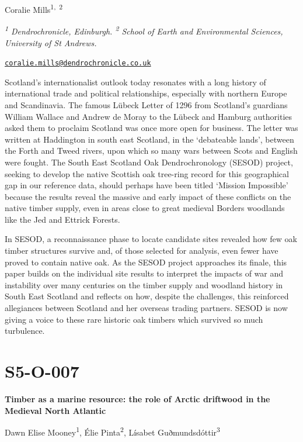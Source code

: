 \documentclass[
]{book}
\begin{document}
Coralie Mills\textsuperscript{1,~2}

\emph{\textsuperscript{1} Dendrochronicle, Edinburgh. \textsuperscript{2} School of Earth and Environmental Sciences, University of St Andrews.}

\href{mailto:coralie.mills@dendrochronicle.co.uk}{\nolinkurl{coralie.mills@dendrochronicle.co.uk}}

Scotland's internationalist outlook today resonates with a long history of international trade and political relationships, especially with northern Europe and Scandinavia. The famous Lübeck Letter of 1296 from Scotland's guardians William Wallace and Andrew de Moray to the Lübeck and Hamburg authorities asked them to proclaim Scotland was once more open for business. The letter was written at Haddington in south east Scotland, in the `debateable lands', between the Forth and Tweed rivers, upon which so many wars between Scots and English were fought. The South East Scotland Oak Dendrochronology (SESOD) project, seeking to develop the native Scottish oak tree-ring record for this geographical gap in our reference data, should perhaps have been titled `Mission Impossible' because the results reveal the massive and early impact of these conflicts on the native timber supply, even in areas close to great medieval Borders woodlands like the Jed and Ettrick Forests.

In SESOD, a reconnaissance phase to locate candidate sites revealed how few oak timber structures survive and, of those selected for analysis, even fewer have proved to contain native oak. As the SESOD project approaches its finale, this paper builds on the individual site results to interpret the impacts of war and instability over many centuries on the timber supply and woodland history in South East Scotland and reflects on how, despite the challenges, this reinforced allegiances between Scotland and her overseas trading partners. SESOD is now giving a voice to these rare historic oak timbers which survived so much turbulence.

\hypertarget{s5-o-007}{%
\section*{S5-O-007}\label{s5-o-007}}

\textbf{Timber as a marine resource: the role of Arctic driftwood in the Medieval North Atlantic}

Dawn Elise Mooney\textsuperscript{1}, Élie Pinta\textsuperscript{2}, Lísabet Guðmundsdóttir\textsuperscript{3}
\end{document}
